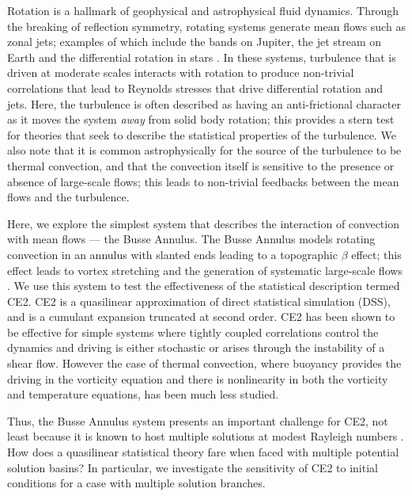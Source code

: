 \documentclass{jfm}
\begin{document}
Rotation is a hallmark of geophysical and astrophysical fluid dynamics.
Through the breaking of reflection symmetry, rotating systems generate mean flows such as zonal jets; examples of which include the bands on Jupiter, the jet stream on Earth and the differential rotation in stars \citep{galperin_read_2019}.
In these systems, turbulence that is driven at moderate scales interacts with rotation to produce non-trivial correlations that lead to Reynolds stresses that drive differential rotation and jets. Here, the turbulence is often described as having an anti-frictional character as it moves the system \textit{away} from solid body rotation; this provides a stern test for theories that seek to describe the statistical properties of the turbulence. We also note that it is common astrophysically for the source of the turbulence to be thermal convection, and that the convection itself is sensitive to the presence or absence of large-scale flows; this leads to non-trivial feedbacks between the mean flows and the turbulence.


Here, we explore the simplest system that describes the interaction of convection with mean flows --- the Busse Annulus. The Busse Annulus models rotating convection in an annulus with slanted ends leading to a topographic $\beta$ effect; this effect leads to vortex stretching and the generation of systematic large-scale flows 
\citep[see e.g.][]{1976Icar...29..255B,bh1993,rj2006}. We use this system to test the effectiveness of the statistical description termed CE2. CE2 is a quasilinear approximation of direct statistical simulation (DSS), and is a cumulant expansion truncated at second order. CE2 has been shown to be effective for simple systems where tightly coupled correlations control the dynamics and driving is either stochastic or arises through the instability of a shear flow. However the case of thermal convection, where buoyancy provides the driving in the vorticity equation and there is nonlinearity in both the vorticity and temperature equations, has been much less studied. 




Thus, the Busse Annulus system presents an important challenge for CE2, not least because it is known to host multiple solutions at modest Rayleigh numbers \citep{bh1993}.
How does a quasilinear statistical theory fare when faced with multiple potential solution basins?
In particular, we investigate the sensitivity of CE2 to initial conditions for a case with multiple solution branches.
\end{document}
